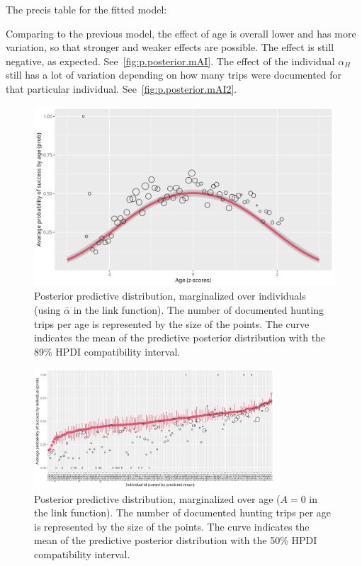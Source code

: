 \documentclass[article, a4paper, 12pt]{memoir}
\begin{document}
The precis table for the fitted model:



Comparing to the previous model, the effect of age is overall lower and has more variation, so that stronger and weaker effects are possible.
The effect is still negative, as expected.
See~\autoref{fig:p.posterior.mAI}.
The effect of the individual $\alpha_H$ still has a lot of variation depending on how many trips were documented for that particular individual.
See~\autoref{fig:p.posterior.mAI2}.

\begin{figure}[!htb]
\begin{center}
    \includegraphics[width=1\textwidth]{./plots/p.posterior.mAI.png}
\end{center}
\caption{Posterior predictive distribution, marginalized over individuals (using $\bar{\alpha}$ in the link function). The number of documented hunting trips per age is represented by the size of the points. The curve indicates the mean of the predictive posterior distribution with the 89\% HPDI compatibility interval.}\label{fig:p.posterior.mAI}
\end{figure}

\begin{figure}[!htb]
\begin{center}
    \includegraphics[width=0.80\textwidth]{./plots/p.posterior.mAI.4.png}
\end{center}
\caption{Posterior predictive distribution, marginalized over age ($A=0$ in the link function). The number of documented hunting trips per age is represented by the size of the points. The curve indicates the mean of the predictive posterior distribution with the 50\% HPDI compatibility interval.}\label{fig:p.posterior.mAI2}
\end{figure}
\end{document}
